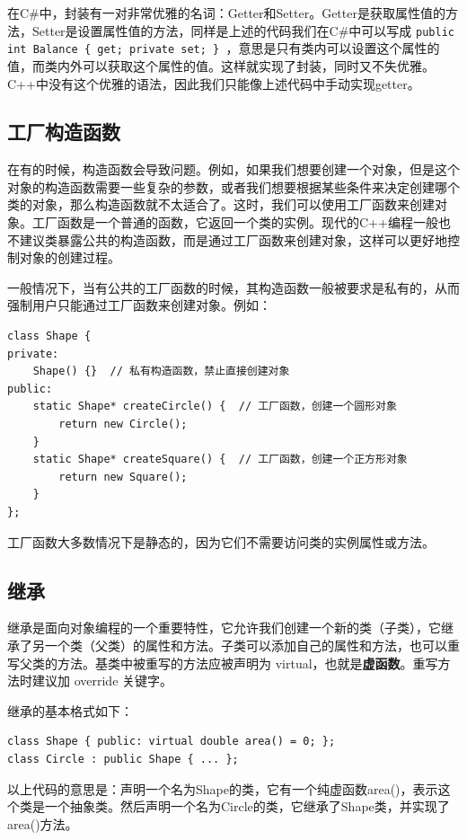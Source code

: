 \begin{tip}
  在C\#中，封装有一对非常优雅的名词：Getter和Setter。Getter是获取属性值的方法，Setter是设置属性值的方法，同样是上述的代码我们在C\#中可以写成 \texttt{public int Balance \{ get; private set; \} }，意思是只有类内可以设置这个属性的值，而类内外可以获取这个属性的值。这样就实现了封装，同时又不失优雅。C++中没有这个优雅的语法，因此我们只能像上述代码中手动实现getter。
\end{tip}

\subsection{工厂构造函数}

在有的时候，构造函数会导致问题。例如，如果我们想要创建一个对象，但是这个对象的构造函数需要一些复杂的参数，或者我们想要根据某些条件来决定创建哪个类的对象，那么构造函数就不太适合了。这时，我们可以使用工厂函数来创建对象。工厂函数是一个普通的函数，它返回一个类的实例。现代的C++编程一般也不建议类暴露公共的构造函数，而是通过工厂函数来创建对象，这样可以更好地控制对象的创建过程。

一般情况下，当有公共的工厂函数的时候，其构造函数一般被要求是私有的，从而强制用户只能通过工厂函数来创建对象。例如：
\begin{verbatim}
class Shape {
private:
    Shape() {}  // 私有构造函数，禁止直接创建对象
public:
    static Shape* createCircle() {  // 工厂函数，创建一个圆形对象
        return new Circle();
    }
    static Shape* createSquare() {  // 工厂函数，创建一个正方形对象
        return new Square();
    }
};
\end{verbatim}
工厂函数大多数情况下是静态的，因为它们不需要访问类的实例属性或方法。

\subsection{继承}

继承是面向对象编程的一个重要特性，它允许我们创建一个新的类（子类），它继承了另一个类（父类）的属性和方法。子类可以添加自己的属性和方法，也可以重写父类的方法。基类中被重写的方法应被声明为 virtual，也就是\textbf{虚函数}。重写方法时建议加 override 关键字。

继承的基本格式如下：
\begin{verbatim}
class Shape { public: virtual double area() = 0; };
class Circle : public Shape { ... };
\end{verbatim}
以上代码的意思是：声明一个名为Shape的类，它有一个纯虚函数area()，表示这个类是一个抽象类。然后声明一个名为Circle的类，它继承了Shape类，并实现了area()方法。

